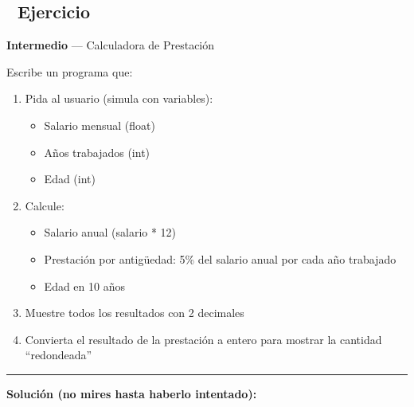 \documentclass[
  doc,
  floatsintext,
  longtable,
  a4paper,
  nolmodern,
  notxfonts,
  notimes,
  12pt,
  colorlinks=true,linkcolor=blue,citecolor=blue,urlcolor=blue]{apa7}
\providecommand{\tightlist}{%
  \setlength{\itemsep}{0pt}\setlength{\parskip}{0pt}}
\begin{document}
\subsection{📝 Ejercicio}\label{ejercicio}

\textbf{Intermedio} --- Calculadora de Prestación

Escribe un programa que:

\begin{enumerate}
\def\labelenumi{\arabic{enumi}.}
\tightlist
\item
  Pida al usuario (simula con variables):

  \begin{itemize}
  \tightlist
  \item
    Salario mensual (float)
  \item
    Años trabajados (int)
  \item
    Edad (int)
  \end{itemize}
\item
  Calcule:

  \begin{itemize}
  \tightlist
  \item
    Salario anual (salario * 12)
  \item
    Prestación por antigüedad: 5\% del salario anual por cada año
    trabajado
  \item
    Edad en 10 años
  \end{itemize}
\item
  Muestre todos los resultados con 2 decimales
\item
  Convierta el resultado de la prestación a entero para mostrar la
  cantidad ``redondeada''
\end{enumerate}

\begin{center}\rule{0.5\linewidth}{0.5pt}\end{center}

\textbf{Solución (no mires hasta haberlo intentado):}
\end{document}
